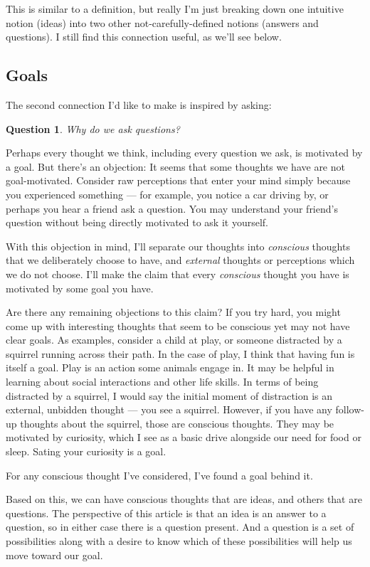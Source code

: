 \documentclass[11pt, oneside]{article}
\newtheorem*{question*}{Question}
\begin{document}
This is similar to a definition, but really I'm just breaking down
one intuitive notion (ideas) into two other not-carefully-defined notions
(answers and questions). I still find this connection useful, as we'll see
below.

\subsection{Goals}

The second connection I'd like to make is inspired by asking:
\begin{question*}
    Why do we ask questions?
\end{question*}

Perhaps every thought we think, including every question we ask,
is motivated by a goal.
But there's an objection: It seems that some thoughts
we have are not goal-motivated.
Consider raw perceptions that enter your mind simply because
you experienced something --- for example, you notice a car driving by,
or perhaps you hear a friend ask a question. You may understand
your friend's question without being directly motivated to ask it yourself.

With this objection in mind, I'll separate our thoughts into
{\em conscious} thoughts that we deliberately choose to have,
and {\em external} thoughts or perceptions which we do not choose.
I'll make the claim that every {\em conscious} thought you have
is motivated by some goal you have.

Are there any remaining objections to this claim?
If you try hard, you might come up with interesting 
thoughts that seem to be conscious yet may not have
clear goals. As examples, consider a child at play, or
someone distracted by a squirrel running across their path.
In the case of play, I think that having fun is itself a goal.
Play is an action some animals engage in.
It may be helpful in learning about social interactions and
other life skills.
In terms of being distracted by a squirrel,
I would say the initial moment of distraction is an
external, unbidden thought --- you see a squirrel. However,
if you have any follow-up thoughts about the squirrel, those
are conscious thoughts. They may be motivated by
curiosity, which I see as a basic drive alongside
our need for food or sleep.
Sating your curiosity is a goal.

For any conscious thought I've considered, I've
found a goal behind it.

Based on this, we can have conscious thoughts that are ideas, and others that
are questions. The perspective of this article is that an idea is an answer to a
question, so in either case there is a question present. And a question is a set
of possibilities along with a desire to know which of these possibilities will
help us move toward our goal.
\end{document}
